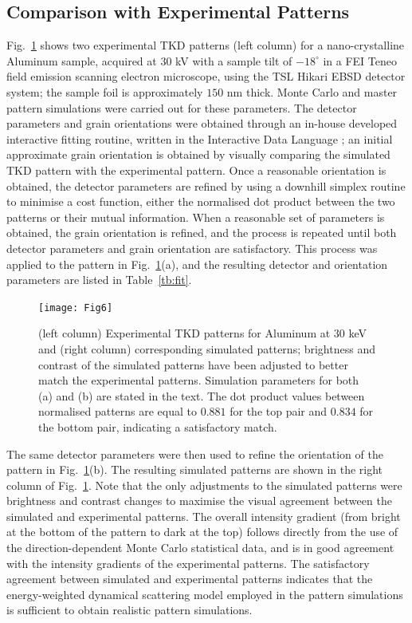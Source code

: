 \subsection{Comparison with Experimental Patterns\label{sec:compexp}}

Fig.~\ref{fig:TKDpatternfit} shows two experimental TKD patterns (left column) for a nano-crystalline Aluminum sample, acquired at $30$ kV with a sample tilt of $-18^{\circ}$ in a FEI Teneo field emission scanning electron microscope, using the TSL Hikari EBSD detector system; the sample foil is approximately $150$ nm thick.  Monte Carlo and master pattern simulations were carried out for these parameters.  The detector parameters and grain orientations were obtained through an in-house developed interactive fitting routine, written in the Interactive Data Language \cite{IDL}; an initial approximate grain orientation is obtained by visually comparing the simulated TKD pattern with the experimental pattern.  Once a reasonable orientation is obtained, the detector parameters are refined by using a downhill simplex routine to minimise a cost function, either the normalised dot product between the two patterns or their mutual information.  When a reasonable set of parameters is obtained, the grain orientation is refined, and the process is repeated until both detector parameters and grain orientation are satisfactory.  This process was applied to the pattern in Fig.~\ref{fig:TKDpatternfit}(a), and the resulting detector and orientation parameters are listed in Table~\ref{tb:fit}.   


\begin{figure}[t]
\centering\leavevmode
\texttt{[image: Fig6]}
\caption{(left column) Experimental TKD patterns for Aluminum at $30$ keV and (right column) corresponding simulated patterns; brightness and contrast of the simulated patterns have been adjusted to better match the experimental patterns.  Simulation parameters for both (a) and (b) are stated in the text. The dot product values between normalised patterns are equal to $0.881$ for the top pair and $0.834$ for the bottom pair, indicating a satisfactory match.}
\label{fig:TKDpatternfit}
\end{figure}

The same detector parameters were then used to refine the orientation of the pattern in Fig.~\ref{fig:TKDpatternfit}(b).  The resulting simulated patterns are shown in the right column of Fig.~\ref{fig:TKDpatternfit}.  Note that the only adjustments to the simulated patterns were brightness and contrast changes to maximise the visual agreement between the simulated and experimental patterns.  The overall intensity gradient (from bright at the bottom of the pattern to dark at the top) follows directly from the use of the direction-dependent Monte Carlo statistical data, and is in good agreement with the intensity gradients of the experimental patterns.  The satisfactory agreement between simulated and experimental patterns indicates that the energy-weighted dynamical scattering model employed in the pattern simulations is sufficient to obtain realistic pattern simulations. 




